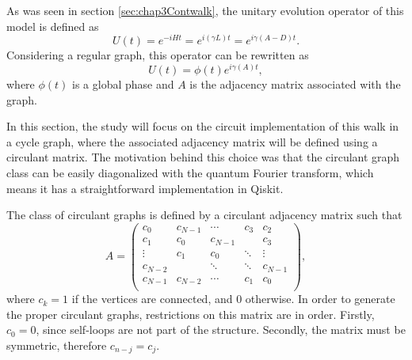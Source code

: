 \documentclass[../../dissertation.tex]{subfiles}
\begin{document}
As was seen in section \ref{sec:chap3Contwalk}, the unitary evolution operator
of this model is defined as
\begin{equation}
        U(t) = e^{-iHt} = e^{i(\gamma L)t} = e^{i\gamma(A-D)t}.
\end{equation}
Considering a regular graph, this operator can be rewritten as 
\begin{equation}
	U(t) = \phi(t) e^{i\gamma(A)t},
\end{equation}
where $\phi(t)$ is a global phase and $A$ is the adjacency matrix associated
with the graph.\par

In this section, the study will focus on the circuit implementation of this walk in a
cycle graph, where the associated adjacency matrix will be defined using a circulant matrix. The motivation behind this choice was that the circulant graph class can be easily diagonalized with the quantum Fourier transform, which means it has a straightforward implementation in Qiskit.\par The class of circulant
graphs is defined by a circulant adjacency matrix such that
\begin{equation}
A = 
	\begin{pmatrix}
		c_0&c_{N-1}& \cdots&c_3&c_2 \\
		c_1&c_0& c_{N-1}& &c_{3} \\
		\vdots & c_1 & c_0 &\ddots & \vdots\\
		c_{N-2}& & \ddots&\ddots &c_{N-1}\\
		c_{N-1} & c_{N-2} & \cdots & c_1 & c_0\\
	\end{pmatrix},
\label{eq:adjCirculant}
\end{equation}
where $c_k = 1$ if the vertices are connected, and $0$ otherwise.
In order to generate the proper circulant graphs, restrictions on this matrix
are in order. Firstly, $c_0=0$, since self-loops are not part of the structure.
Secondly, the matrix must be symmetric, therefore $c_{n-j} = c_j$.\par
\end{document}
